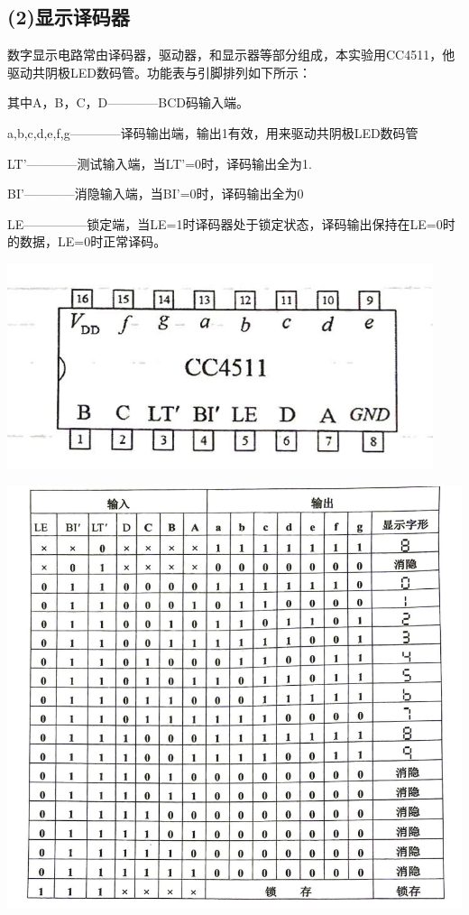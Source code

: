 \documentclass{ctexart}
\begin{document}
    \subsection*{(2)显示译码器}
    数字显示电路常由译码器，驱动器，和显示器等部分组成，本实验用CC4511，他驱动共阴极LED数码管。功能表与引脚排列如下所示：

    
    其中A，B，C，D————BCD码输入端。

    a,b,c,d,e,f,g————译码输出端，输出1有效，用来驱动共阴极LED数码管

    LT'————测试输入端，当LT'=0时，译码输出全为1.

    BI'————消隐输入端，当BI'=0时，译码输出全为0

    LE—————锁定端，当LE=1时译码器处于锁定状态，译码输出保持在LE=0时的数据，LE=0时正常译码。
    
    \begin{minipage}[c]{0.5\textwidth}
        \centering
        \includegraphics[width=0.8\linewidth]{2.2.3.png} 
    \end{minipage}
    \begin{minipage}[c]{0.45\textwidth}
        \centering
        \includegraphics[width=1.2\linewidth]{2.2.4.png} 
    \end{minipage}
\end{document}
